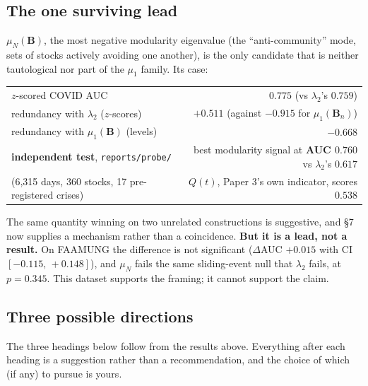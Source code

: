 \documentclass[11pt,a4paper]{article}
\newcommand{\Bmat}{\mathbf{B}}
\newcommand{\Bn}{\Bmat_{n}}
\begin{document}
\subsection*{The one surviving lead}

$\mu_N(\Bmat)$, the most negative modularity eigenvalue (the ``anti-community''
mode, sets of stocks actively avoiding one another), is the only candidate that is
neither tautological nor part of the $\mu_1$ family. Its case:

\begin{center}\small
\renewcommand{\arraystretch}{1.15}
\begin{tabular}{@{}lr@{}}
\toprule
$z$-scored COVID AUC & $0.775$ \quad(vs $\lambda_2$'s $0.759$) \\
redundancy with $\lambda_2$ ($z$-scores) & $+0.511$ \quad(against $-0.915$ for $\mu_1(\Bn)$) \\
redundancy with $\mu_1(\Bmat)$ (levels) & $-0.668$ \\
\textbf{independent test}, \texttt{reports/probe/} & best modularity signal at
\textbf{AUC $0.760$} vs $\lambda_2$'s $0.617$ \\
\quad\small(6{,}315 days, 360 stocks, 17 pre-registered crises) & \small$Q(t)$, Paper 3's
own indicator, scores $0.538$ \\
\bottomrule
\end{tabular}
\end{center}

The same quantity winning on two unrelated constructions is suggestive, and \S7
now supplies a mechanism rather than a coincidence. \textbf{But it is a lead, not a
result.} On FAAMUNG the difference is not significant ($\Delta$AUC $+0.015$ with
CI $[-0.115,\,+0.148]$), and $\mu_N$ fails the same sliding-event null that
$\lambda_2$ fails, at $p=0.345$. This dataset supports the framing; it cannot
support the claim.

\subsection*{Three possible directions}

The three headings below follow from the results above. Everything after each
heading is a suggestion rather than a recommendation, and the choice of which (if
any) to pursue is yours.
\end{document}
